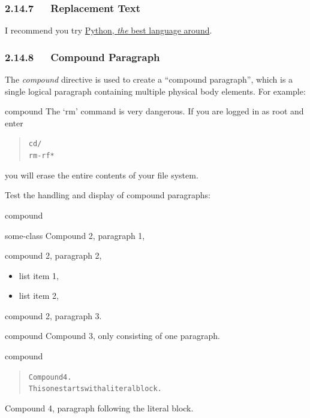 \documentclass[a4paper]{article}
\begin{document}
\subsubsection{2.14.7   Replacement Text%
  \label{replacement-text}%
}

I recommend you try \href{http://www.python.org/}{Python, \emph{the} best language around}.


\subsubsection{2.14.8   Compound Paragraph%
  \label{compound-paragraph}%
}

The \emph{compound} directive is used to create a “compound paragraph”, which
is a single logical paragraph containing multiple physical body
elements. For example:

\begin{DUclass}{compound}
The ‘rm’ command is very dangerous.  If you are logged
in as root and enter
\begin{quote}
\begin{alltt}
cd /
rm -rf *
\end{alltt}
\end{quote}
you will erase the entire contents of your file system.
\end{DUclass}

Test the handling and display of compound paragraphs:

\begin{DUclass}{compound}
\begin{DUclass}{some-class}
Compound 2, paragraph 1,

compound 2, paragraph 2,
\begin{itemize}
\item list item 1,

\item list item 2,
\end{itemize}
compound 2, paragraph 3.
\end{DUclass}
\end{DUclass}

\begin{DUclass}{compound}
Compound 3, only consisting of one paragraph.
\end{DUclass}

\begin{DUclass}{compound}
\begin{quote}
\begin{alltt}
Compound 4.
This one starts with a literal block.
\end{alltt}
\end{quote}
Compound 4, paragraph following the literal block.
\end{DUclass}
\end{document}
